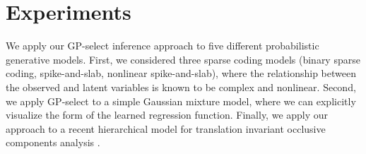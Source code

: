 \section{Experiments}
\label{exps}
%
We apply our GP-select inference approach to five different probabilistic generative models.
%
First, we considered three sparse coding models (binary sparse coding,
spike-and-slab, nonlinear spike-and-slab), where the relationship between the
observed and latent variables is known to be complex and nonlinear.
%
Second, we apply GP-select to a simple Gaussian mixture model,
where we can explicitly visualize the form of the learned regression function.
%
Finally, we apply our approach to a recent hierarchical model for translation invariant occlusive components analysis
\citep{DaiLucke2012a,DaiEtAl2013,DaiLucke2014}.


